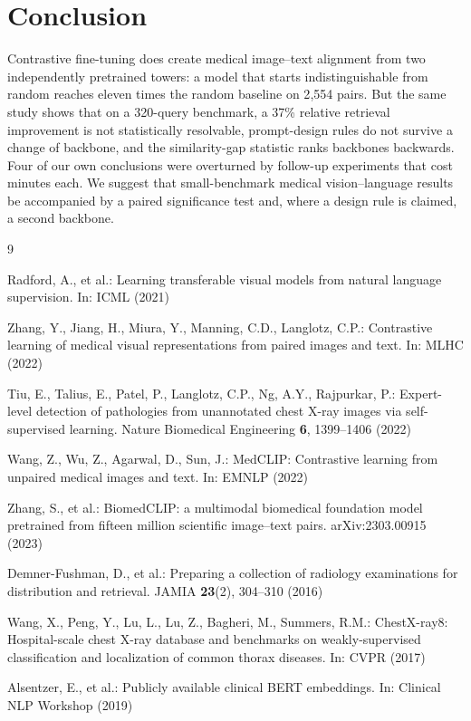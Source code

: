 \documentclass[runningheads]{llncs}
\begin{document}
\section{Conclusion}

Contrastive fine-tuning does create medical image--text alignment from two
independently pretrained towers: a model that starts indistinguishable from
random reaches eleven times the random baseline on 2{,}554 pairs. But the same
study shows that on a 320-query benchmark, a 37\% relative retrieval improvement
is not statistically resolvable, prompt-design rules do not survive a change of
backbone, and the similarity-gap statistic ranks backbones backwards. Four of our
own conclusions were overturned by follow-up experiments that cost minutes each.
We suggest that small-benchmark medical vision--language results be accompanied
by a paired significance test and, where a design rule is claimed, a second
backbone.

\begin{thebibliography}{9}

Radford, A., et al.: Learning transferable visual models from natural language
supervision. In: ICML (2021)

Zhang, Y., Jiang, H., Miura, Y., Manning, C.D., Langlotz, C.P.: Contrastive
learning of medical visual representations from paired images and text. In: MLHC
(2022)

Tiu, E., Talius, E., Patel, P., Langlotz, C.P., Ng, A.Y., Rajpurkar, P.:
Expert-level detection of pathologies from unannotated chest X-ray images via
self-supervised learning. Nature Biomedical Engineering \textbf{6}, 1399--1406
(2022)

Wang, Z., Wu, Z., Agarwal, D., Sun, J.: MedCLIP: Contrastive learning from
unpaired medical images and text. In: EMNLP (2022)

Zhang, S., et al.: BiomedCLIP: a multimodal biomedical foundation model
pretrained from fifteen million scientific image--text pairs. arXiv:2303.00915
(2023)

Demner-Fushman, D., et al.: Preparing a collection of radiology examinations for
distribution and retrieval. JAMIA \textbf{23}(2), 304--310 (2016)

Wang, X., Peng, Y., Lu, L., Lu, Z., Bagheri, M., Summers, R.M.: ChestX-ray8:
Hospital-scale chest X-ray database and benchmarks on weakly-supervised
classification and localization of common thorax diseases. In: CVPR (2017)

Alsentzer, E., et al.: Publicly available clinical BERT embeddings. In: Clinical
NLP Workshop (2019)

\end{thebibliography}
\end{document}
